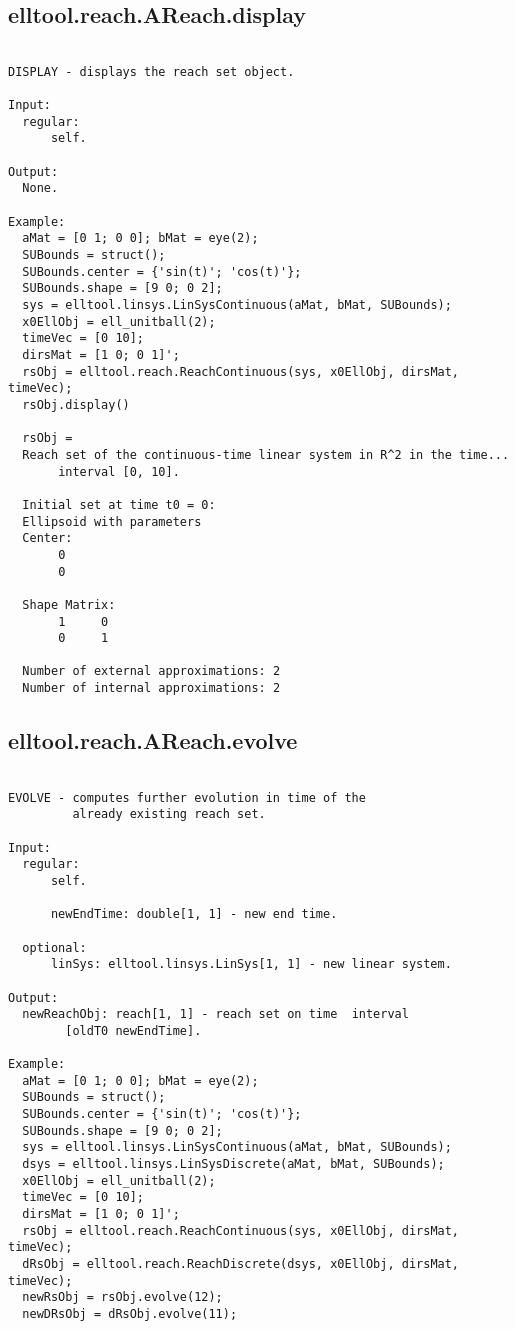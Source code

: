 \subsection{\texorpdfstring{elltool.reach.AReach.display}{display}}\label{method:elltool.reach.AReach.display}
\begin{verbatim}

DISPLAY - displays the reach set object.

Input:
  regular:
      self.

Output:
  None.

Example:
  aMat = [0 1; 0 0]; bMat = eye(2);
  SUBounds = struct();
  SUBounds.center = {'sin(t)'; 'cos(t)'};
  SUBounds.shape = [9 0; 0 2];
  sys = elltool.linsys.LinSysContinuous(aMat, bMat, SUBounds);
  x0EllObj = ell_unitball(2);
  timeVec = [0 10];
  dirsMat = [1 0; 0 1]';
  rsObj = elltool.reach.ReachContinuous(sys, x0EllObj, dirsMat, timeVec);
  rsObj.display()

  rsObj =
  Reach set of the continuous-time linear system in R^2 in the time...
       interval [0, 10].

  Initial set at time t0 = 0:
  Ellipsoid with parameters
  Center:
       0
       0

  Shape Matrix:
       1     0
       0     1

  Number of external approximations: 2
  Number of internal approximations: 2
\end{verbatim}
\subsection{\texorpdfstring{elltool.reach.AReach.evolve}{evolve}}\label{method:elltool.reach.AReach.evolve}
\begin{verbatim}

EVOLVE - computes further evolution in time of the
         already existing reach set.

Input:
  regular:
      self.

      newEndTime: double[1, 1] - new end time.

  optional:
      linSys: elltool.linsys.LinSys[1, 1] - new linear system.

Output:
  newReachObj: reach[1, 1] - reach set on time  interval
        [oldT0 newEndTime].

Example:
  aMat = [0 1; 0 0]; bMat = eye(2);
  SUBounds = struct();
  SUBounds.center = {'sin(t)'; 'cos(t)'};
  SUBounds.shape = [9 0; 0 2];
  sys = elltool.linsys.LinSysContinuous(aMat, bMat, SUBounds);
  dsys = elltool.linsys.LinSysDiscrete(aMat, bMat, SUBounds);
  x0EllObj = ell_unitball(2);
  timeVec = [0 10];
  dirsMat = [1 0; 0 1]';
  rsObj = elltool.reach.ReachContinuous(sys, x0EllObj, dirsMat, timeVec);
  dRsObj = elltool.reach.ReachDiscrete(dsys, x0EllObj, dirsMat, timeVec);
  newRsObj = rsObj.evolve(12);
  newDRsObj = dRsObj.evolve(11);
\end{verbatim}

